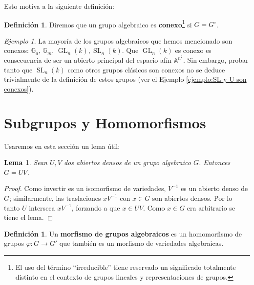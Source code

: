 \documentclass[spanish,12pt]{amsart}
\newtheorem{lemma}[theorem]{Lema}
\theoremstyle{definition}
\newtheorem{definition}[theorem]{Definición}
\theoremstyle{remark}
\newtheorem{example}[theorem]{Ejemplo}
\numberwithin{equation}{section}
\newcommand{\afine}[1]{\mathbb{A}^{#1}}
\begin{document}
Esto motiva a la siguiente definición:
\begin{definition}
Diremos que un grupo algebraico es \textbf{conexo}\footnote{El uso del término ``irreducible'' tiene reservado un significado totalmente distinto en el contexto de grupos lineales y representaciones de grupos.} si $G = G^\circ$.
\end{definition}

\begin{example}
La mayoría de los grupos algebraicos que hemos mencionado son conexos: $\mathbb G_a$, $\mathbb{G}_m$, $\operatorname{GL}_n (k), \operatorname{SL}_n (k)$. Que $\operatorname{GL}_n (k)$ es conexo es consecuencia de ser un abierto principal del espacio afín $\afine {n^2}$. Sin embargo, probar tanto que $\operatorname{SL}_n (k)$ como otros grupos clásicos son conexos no se deduce trivialmente de la definición de estos grupos (ver el Ejemplo \ref{ejemplo:SL y U son conexos}).
\end{example}

\section{Subgrupos y Homomorfismos}

Usaremos en esta sección un lema útil:
\begin{lemma}
Sean $U,V$ dos abiertos densos de un grupo algebraico $G$. Entonces $G = U V$.
\end{lemma}
\begin{proof}
Como invertir es un isomorfismo de variedades, $V^{-1}$ es un abierto denso de $G$; similarmente, las traslaciones $x V^{-1}$ con $x \in G$ son abiertos densos. Por lo tanto $U$ interseca $x V^{-1}$, forzando a que $x \in U V$. Como $x \in G$ era arbitrario se tiene el lema.
\end{proof}

\begin{definition}
Un \textbf{morfismo de grupos algebraicos} es un homomorfismo de grupos $\varphi : G \to G'$ que también es un morfismo de variedades algebraicas.
\end{definition}
\end{document}
